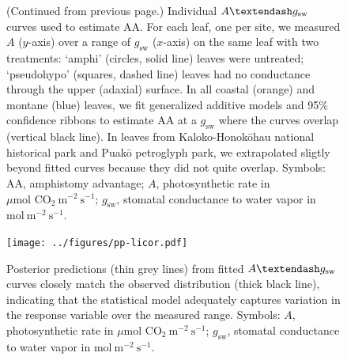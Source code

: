 \documentclass[
  letterpaper,
  DIV=11,
  numbers=noendperiod]{scrartcl}
\begin{document}
\newpage

\setcounter{figure}{\numexpr\value{figure}-1\relax}

\begin{figure}
  \caption{(Continued from previous page.) Individual $A \textendash g_\mathrm{sw}$ curves used to estimate $\mathrm{AA}$. For each leaf, one per site, we measured $A$ ($y$-axis) over a range of $g_\mathrm{sw}$ ($x$-axis) on the same leaf with two treatments: `amphi' (circles, solid line) leaves were untreated; `pseudohypo' (squares, dashed line) leaves had no conductance through the upper (adaxial) surface. In all coastal (orange) and montane (blue) leaves, we fit generalized additive models and 95\% confidence ribbons to estimate $\mathrm{AA}$ at a $g_\mathrm{sw}$ where the curves overlap (vertical black line). In leaves from Kaloko-Honokōhau national historical park and Puakō petroglyph park, we extrapolated sligtly beyond fitted curves because they did not quite overlap. Symbols: $\mathrm{AA}$, amphistomy advantage; $A$, photosynthetic rate in $\mu \text{mol CO}_2~\text{m}^{-2}~\text{s}^{-1}$; $g_\mathrm{sw}$, stomatal conductance to water vapor in $\text{mol}~\text{m}^{-2}~\text{s}^{-1}$.}
  \label{fig:licor}
\end{figure}

\newpage

\begin{figure}
  \texttt{[image: ../figures/pp-licor.pdf]}
  \caption{Posterior predictions (thin grey lines) from fitted $A \textendash g_\mathrm{sw}$ curves closely match the observed distribution (thick black line), indicating that the statistical model adequately captures variation in the response variable over the measured range. Symbols: $A$, photosynthetic rate in $\mu \text{mol CO}_2~\text{m}^{-2}~\text{s}^{-1}$; $g_\mathrm{sw}$, stomatal conductance to water vapor in $\text{mol}~\text{m}^{-2}~\text{s}^{-1}$.}
  \label{fig:pp-licor}
\end{figure}

\newpage
\end{document}

